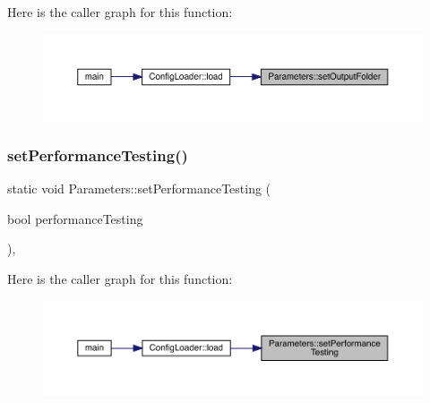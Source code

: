Here is the caller graph for this function\+:\nopagebreak
\begin{figure}[H]
\begin{center}
\leavevmode
\includegraphics[width=350pt]{class_parameters_a58dff6fbcc88bb916b9590057bf338ff_icgraph}
\end{center}
\end{figure}
\mbox{\label{class_parameters_a0b9d1947d6a3a016ed196d97b548730d}} 
\subsubsection{\texorpdfstring{setPerformanceTesting()}{setPerformanceTesting()}}
{\footnotesize\ttfamily static void Parameters\+::set\+Performance\+Testing (\begin{DoxyParamCaption}\item[{bool}]{performance\+Testing }\end{DoxyParamCaption})\hspace{0.3cm}{\ttfamily [inline]}, {\ttfamily [static]}}

Here is the caller graph for this function\+:\nopagebreak
\begin{figure}[H]
\begin{center}
\leavevmode
\includegraphics[width=350pt]{class_parameters_a0b9d1947d6a3a016ed196d97b548730d_icgraph}
\end{center}
\end{figure}
\mbox{\label{class_parameters_a4c983b1ab17ec51be118792b3a6d17a5}} 
